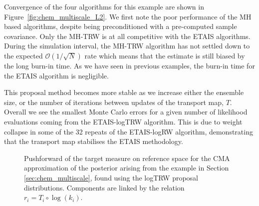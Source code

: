 \documentclass[final]{siamltex}
\newcommand{\edit}[1]{{\color{red} #1}}
\begin{document}
\edit{
Convergence of the four algorithms for this example are shown in
Figure~\ref{fig:chem_multiscale_L2}. We first note the poor
performance of the MH based algorithms, despite being preconditioned
with a pre-computed sample covariance. Only the MH-TRW is at all competitive with the ETAIS algorithms. During the simulation interval, the MH-TRW algorithm has not settled down to the expected $\mathcal{O}(1/\sqrt{N})$ rate which means that the estimate is still biased by the long burn-in time. As we have seen in previous examples, the burn-in time for the ETAIS algorithm is negligible.

This proposal method
becomes more stable as we increase either the ensemble size, or the
number of iterations between updates of the transport map,
$T$. Overall we see the smallest Monte Carlo errors for a given number
of likelihood evaluations coming from the ETAIS-logTRW algorithm. This
is due to weight collapse in some of the 32 repeats of the ETAIS-logRW
algorithm, demonstrating that the transport map stabilises the ETAIS methodology.
}

\begin{figure}[!htb]
\centering
\caption{\edit{Pushforward of the target measure on reference space for the CMA
  approximation of the  posterior arising from the example in Section \ref{sec:chem_multiscale}, found using the logTRW proposal distributions. Components are linked by the relation $r_i = T_i\circ\log(k_i)$.}}
\label{fig:chem_reference_spaces}
\end{figure}
\end{document}
